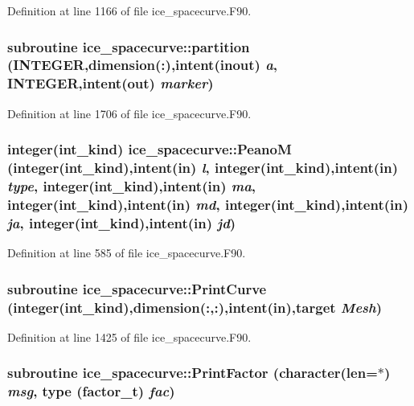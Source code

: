 Definition at line 1166 of file ice\_\-spacecurve.F90.\hypertarget{namespaceice__spacecurve_a99e4bd1c6625a5a14e10c5fa91f0df33}{
\subsubsection[{partition}]{\setlength{\rightskip}{0pt plus 5cm}subroutine ice\_\-spacecurve::partition (INTEGER,dimension(:),intent(inout) {\em a}, \/  INTEGER,intent(out) {\em marker})}}
\label{namespaceice__spacecurve_a99e4bd1c6625a5a14e10c5fa91f0df33}


Definition at line 1706 of file ice\_\-spacecurve.F90.\hypertarget{namespaceice__spacecurve_afe83a0d2757c7c07a40d410b98e66728}{
\subsubsection[{PeanoM}]{\setlength{\rightskip}{0pt plus 5cm}integer(int\_\-kind) ice\_\-spacecurve::PeanoM (integer(int\_\-kind),intent(in) {\em l}, \/  integer(int\_\-kind),intent(in) {\em type}, \/  integer(int\_\-kind),intent(in) {\em ma}, \/  integer(int\_\-kind),intent(in) {\em md}, \/  integer(int\_\-kind),intent(in) {\em ja}, \/  integer(int\_\-kind),intent(in) {\em jd})}}
\label{namespaceice__spacecurve_afe83a0d2757c7c07a40d410b98e66728}


Definition at line 585 of file ice\_\-spacecurve.F90.\hypertarget{namespaceice__spacecurve_ab6b0639f3e032362a2ad97a2e4e160e5}{
\subsubsection[{PrintCurve}]{\setlength{\rightskip}{0pt plus 5cm}subroutine ice\_\-spacecurve::PrintCurve (integer(int\_\-kind),dimension(:,:),intent(in),target {\em Mesh})}}
\label{namespaceice__spacecurve_ab6b0639f3e032362a2ad97a2e4e160e5}


Definition at line 1425 of file ice\_\-spacecurve.F90.\hypertarget{namespaceice__spacecurve_a64dc0958c7c88a5de6316e7c2f6189b5}{
\subsubsection[{PrintFactor}]{\setlength{\rightskip}{0pt plus 5cm}subroutine ice\_\-spacecurve::PrintFactor (character(len=$\ast$) {\em msg}, \/  type (factor\_\-t) {\em fac})}}
\label{namespaceice__spacecurve_a64dc0958c7c88a5de6316e7c2f6189b5}


